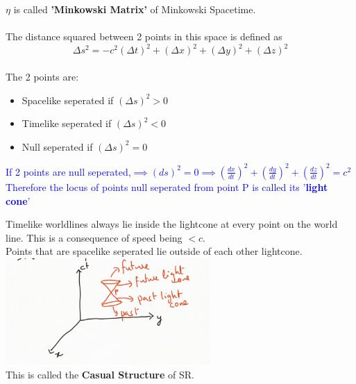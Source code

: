 \documentclass{article}
\newcommand\note[1]{\textcolor{blue}{#1}}
\begin{document}
\\ \\ 
$\eta $ is called \textbf{'Minkowski Matrix'} of Minkowski Spacetime.\\
\\
The distance squared between 2 points in this space is defined as $$\Delta s^2=-c^2(\Delta t)^2+(\Delta x)^2+(\Delta y)^2+(\Delta z)^2$$
\\
The 2 points are:
\begin{itemize}
    \item Spacelike seperated if $(\Delta s)^2>0$
    \item Timelike seperated if $(\Delta s)^2<0$
    \item Null seperated if $(\Delta s)^2=0$
\end{itemize}
\note{If 2 points are null seperated,$\implies ( ds)^2=0 \implies (\frac{dx}{dt})^2+(\frac{dy}{dt})^2+(\frac{dz}{dt})^2=c^2$\\ Therefore the locus of points null seperated from point P is called its '\textbf{light cone}' }

 Timelike worldlines always lie inside the lightcone at every point on the world line. This is a consequence of speed being $<c.$ \\
Points that are spacelike seperated lie outside of each other lightcone.\\
\includegraphics[width=0.5\linewidth]{causal structure.png} \\
This is called the \textbf{Casual Structure} of SR.
\end{document}
